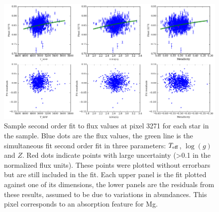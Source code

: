 \documentclass[preprint]{aastex}
\begin{document}
\begin{figure}%
\centering
\includegraphics[width = \linewidth]{pix3271fit.png}
\caption{Sample second order fit to flux values at pixel 3271 for each star in the sample. Blue dots are the flux values, the green line is the simultaneous fit second order fit in three parameters: $T_{\rm eff}$, $\log(g)$ and $Z$. Red dots indicate points with large uncertainty (>0.1 in the normalized flux units). These points were plotted without errorbars but are still included in the fit. Each upper panel is the fit plotted against one of its dimensions, the lower panels are the residuals from these results, assumed to be due to variations in abundances. This pixel corresponds to an absorption feature for Mg.}
\label{fig:fit}
\end{figure}
\end{document}
